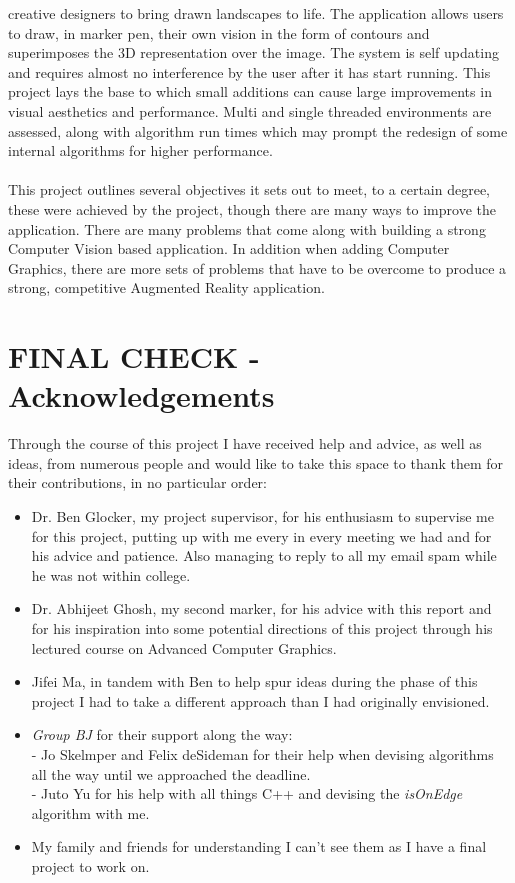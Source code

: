 \documentclass[11pt]{article}
\begin{document}
creative designers to bring drawn landscapes to life. The application
allows users to draw, in marker pen, their own vision in the form
of contours and superimposes the 3D representation over the image.
The system is self updating and requires almost no interference by the 
user after it has start running. This project lays the base to
which small additions
can cause large improvements in visual aesthetics and performance.
Multi and single threaded environments are assessed, 
along with algorithm run times which may prompt the redesign of some
internal algorithms for higher performance.\\
\\
This project outlines several objectives it sets out to meet, to a certain degree,
these were achieved by the project, though there are many ways to improve
the application. There are many problems that come along with building
a strong Computer Vision based application. In addition when adding
Computer Graphics, there are more sets of problems that have to
be overcome to produce a strong, competitive Augmented Reality application.

\newpage
\section*{FINAL CHECK - Acknowledgements}
Through the course of this project I have received help and advice, as
well as ideas, from numerous people and would like to take this space
to thank them for their contributions, in no particular order:
\begin{itemize}
	\item Dr. Ben Glocker, my project supervisor, for his enthusiasm
		  to supervise me for this project, putting up with me every 
		  in every meeting we had and for his advice and patience. Also
		  managing to reply to all my email spam while he was not
		  within college.
	\item Dr. Abhijeet Ghosh, my second marker, for his advice with
		  this report and for his inspiration into some potential
		  directions of this project through his lectured course on
		  Advanced Computer Graphics.
	\item Jifei Ma, in tandem with Ben to help spur ideas during the
		  phase of this project I had to take a different approach than
		  I had originally envisioned.
	\item \textit{Group BJ} for their support along the way: \\
		  - Jo Skelmper and Felix deSideman for their help when devising
		  algorithms all the way until we approached the deadline.\\
		  - Juto Yu for his help with all things C++ and devising the
		  	\textit{isOnEdge} algorithm with me.
	\item My family and friends for understanding I can't see them as I
		  have a final project to work on.
\end{itemize}
\end{document}
